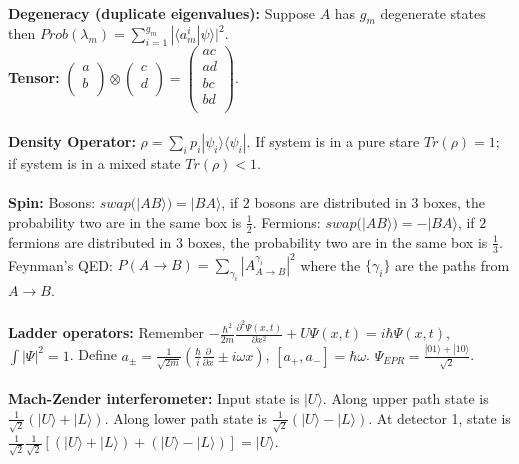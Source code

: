 \\
{\bf Degeneracy (duplicate eigenvalues):}  Suppose $A$ has $g_m$ degenerate states then
$Prob(\lambda_m)= \sum_{i=1}^{g_m} | \langle a_m^i|\psi \rangle |^2$.
\\
{\bf Tensor:}  
$ \left(
\begin{array}{c}
a \\
b \\
\end{array} 
\right)
\otimes
\left(
\begin{array}{c}
c \\
d \\
\end{array} 
\right)
=
\left(
\begin{array}{c}
ac \\
ad \\
bc \\
bd \\
\end{array} 
\right)$.
\\
\\
{\bf Density Operator:}  $\rho= \sum_i p_i |\psi_i \rangle \langle \psi_i|$.  If system is in a pure stare
$Tr(\rho)=1$; if system is in a mixed state $Tr(\rho)<1$.
\\
\\
{\bf Spin:}  
Bosons: $swap(|AB \rangle )= |BA \rangle $, if $2$ bosons are distributed in $3$ boxes,
the probability two are in the same box is ${\frac 1 2}$.
Fermions: $swap(|AB \rangle )= -|BA \rangle $, if $2$ fermions are distributed in $3$ boxes,
the probability two are in the same box is ${\frac 1 3}$.  Feynman's QED:
$P(A \rightarrow B) = \sum_{\gamma_i} |A^{\gamma_i}_{A \rightarrow B}|^2$ where the
$\{\gamma_i \}$ are the paths from $A \rightarrow B$.
\\
\\
{\bf Ladder operators:}  Remember
$-{\frac {\hbar^2} {2m}} {\frac {\partial^2 \Psi (x, t)} {\partial x^2}} +
U \Psi(x,t)= i \hbar \Psi(x,t)$, $\int |\Psi|^2 =1$.  Define $a_{\pm}= {\frac 1 {\sqrt {2m}}}
({\frac {\hbar}{i}} {\frac {\partial} {\partial x}} \pm i \omega x)$, $[a_+ , a_- ]= \hbar \omega$.
$\Psi_{EPR}= {\frac {|01 \rangle + |10 \rangle} {\sqrt 2}}$.
\\
\\
{\bf Mach-Zender interferometer:}  Input state is $|U \rangle$.  
Along upper path state is ${\frac 1 {\sqrt 2}} (|U\rangle + |L\rangle)$.
Along lower path state is 
${\frac 1 {\sqrt 2}} (|U\rangle - |L\rangle)$.
At detector 1, state is 
${\frac 1 {\sqrt 2}} {\frac 1 {\sqrt 2}} [ (|U\rangle + |L\rangle) + (|U\rangle - |L\rangle)] = |U\rangle$. 

